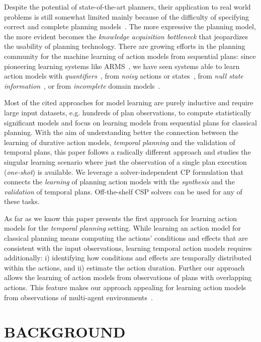 \documentclass{ecai}
\begin{document}
Despite the potential of state-of-the-art planners, their application to real world problems is still somewhat limited mainly because of the difficulty of specifying correct and complete planning models~\cite{kambhampati2007model}. The more expressive the planning model, the more evident becomes the {\em knowledge acquisition bottleneck} that jeopardizes the usability of planning technology. There are growing efforts in the planning community for the machine learning of action models from sequential plans: since pioneering learning systems like ARMS~\cite{yang2007learning}, we have seen systems able to learn action models with {\em quantifiers}~\cite{AmirC08,ZhuoYHL10}, from {\em noisy} actions or states~\cite{MouraoZPS12,zhuo2013action}, from {\em null state information}~\cite{cresswell2013}, or from {\em incomplete} domain models~\cite{ZhuoK17,ZhuoNK13}.

Most of the cited approaches for model learning are purely inductive and require large input datasets, e.g. hundreds of plan observations, to compute statistically significant models and focus on learning models from sequential plans for classical planning. With the aim of understanding better the connection between the learning of durative action models, {\em temporal planning}  and the validation of temporal plans, this paper follows a radically different approach and studies the singular learning scenario where just the observation of a single plan execution ({\em one-shot}) is available. We leverage a solver-independent CP formulation that connects the {\em learning} of planning action models with the {\em synthesis} and the {\em validation} of temporal plans. Off-the-shelf CSP solvers can be used for any of these tasks.  

As far as we know this paper presents the first approach for learning action models for the {\em temporal planning} setting. While learning an action model for classical planning means computing the actions' conditions and effects that are consistent with the input observations, learning temporal action models requires additionally: i) identifying how conditions and effects are temporally distributed within the actions, and ii) estimate the action duration. Further our approach allows the learning of action models from observations of plans with overlapping actions. This feature makes our approach appealing for learning action models from observations of multi-agent environments~\cite{furelos2018carpool}. 



\section{BACKGROUND}
\end{document}
